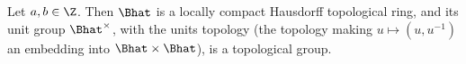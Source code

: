 Let $a,b\in\Z$. Then $\Bhat$ is a locally compact Hausdorff topological ring, and its unit group $\Bhat^\times$, with the units topology
(the topology making $u\mapsto(u,u^{-1})$ an embedding into $\Bhat\times\Bhat$), is a topological group.
